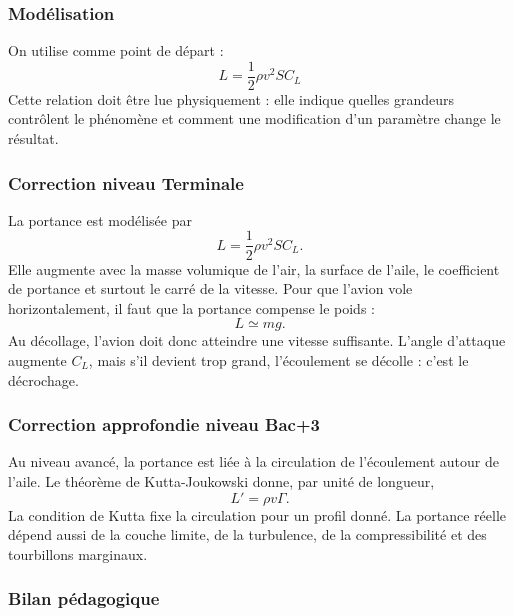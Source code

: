 \documentclass[11pt,a4paper]{article}
\begin{document}
\subsubsection*{Modélisation}

\begin{theorembox}
On utilise comme point de départ :
\[
L=\frac12\rho v^2SC_L
\]
Cette relation doit être lue physiquement : elle indique quelles grandeurs contrôlent le phénomène et comment une modification d'un paramètre change le résultat.
\end{theorembox}

\subsubsection*{Correction niveau Terminale}

\begin{corrigebox}

La portance est modélisée par
\[
L=\frac12\rho v^2SC_L.
\]
Elle augmente avec la masse volumique de l'air, la surface de l'aile, le coefficient de portance et surtout le carré de la vitesse. Pour que l'avion vole horizontalement, il faut que la portance compense le poids :
\[
L\simeq mg.
\]
Au décollage, l'avion doit donc atteindre une vitesse suffisante. L'angle d'attaque augmente \(C_L\), mais s'il devient trop grand, l'écoulement se décolle : c'est le décrochage.

\end{corrigebox}

\subsubsection*{Correction approfondie niveau Bac+3}

\begin{approfondissementbox}

Au niveau avancé, la portance est liée à la circulation de l'écoulement autour de l'aile. Le théorème de Kutta-Joukowski donne, par unité de longueur,
\[
L'=\rho v\Gamma.
\]
La condition de Kutta fixe la circulation pour un profil donné. La portance réelle dépend aussi de la couche limite, de la turbulence, de la compressibilité et des tourbillons marginaux.

\end{approfondissementbox}

\subsubsection*{Bilan pédagogique}
\end{document}
